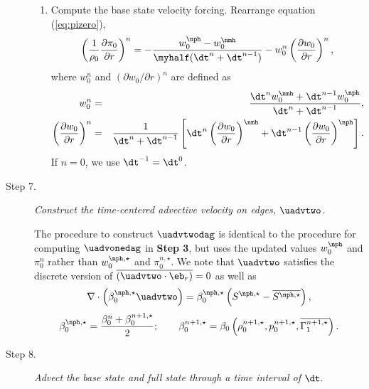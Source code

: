 \begin{description}
\begin{enumerate}
\item Compute the base state velocity forcing.  Rearrange equation (\ref{eq:pizero}),
\begin{equation}
\left ( \frac{1}{\rho_0} \frac{\partial \pi_0}{\partial r} \right )^n = 
-\frac{w_0^{\nph} - w_0^\nmh}{\myhalf(\dt^n+\dt^{n-1})} 
- w_0^n \left(\frac{\partial w_0}{\partial r}\right)^n,
\end{equation}
  where $w_0^{n}$ and $(\partial w_0 / \partial r)^{n}$ are defined as
\begin{eqnarray}
w_0^n &=& \frac{\dt^{n} w_0^{\nmh} + \dt^{n-1} w_0^{\nph}}{\dt^n+\dt^{n-1}}, \\
\left(\frac{\partial w_0}{\partial r}\right)^{n} &=& \frac{1}{\dt^n+\dt^{n-1} } \left [ \dt^{n} \left(\frac{\partial w_0 }{ \partial r}\right)^{\nmh} + \dt^{n-1} \left(\frac{\partial w_0 }{ \partial r}\right)^{\nph} \right ].\nonumber \\
\end{eqnarray}
  If $n=0$, we use $\dt^{-1} = \dt^0$.

\end{enumerate}

\item[Step 7.] {\em Construct the time-centered advective velocity on edges, $\uadvtwo$.}

The procedure to construct $\uadvtwodag$ is identical to the procedure
for computing $\uadvonedag$ in {\bf Step 3}, but uses 
the updated values $w_0^{\nph}$ and $\pi_0^n$ rather than $w_0^{\nph,\star}$ 
and $\pi_0^{n,\star}$.  We note that $\uadvtwo$ satisfies the discrete version of
$\overline{(\uadvtwo\cdot\eb_r)}=0$ as well as
\begin{equation}
\nabla \cdot \left(\beta_0^{\nph,\star} \uadvtwo\right) =
\beta_0^{\nph,\star}\left(S^{\nph,\star} - \overline{S^{\nph,\star}}\right),
\end{equation}
\begin{equation}
\beta_0^{\nph,\star} = \frac{ \beta_0^n +  \beta_0^{n+1,\star} }{2};
\qquad
 \beta_0^{n+1,\star} = \beta_0 \left(\rho_0^{n+1,\star}, p_0^{n+1,\star}, \overline{\Gamma_1^{n+1,\star}}\right).
\end{equation}

\item[Step 8.] {\em Advect the base state and full state through a time interval of $\dt.$}


\end{description}
